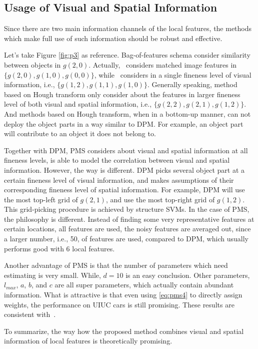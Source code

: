 \subsection{Usage of Visual and Spatial Information}
Since there are two main information channels of the local features, the methods which make full use of such information should be robust and effective.

Let's take Figure \ref{fig:p3} as reference. Bag-of-features schema consider similarity between objects in $g(2,0)$. Actually,~\citep{pmk} considers matched image features in $\{g(2,0),g(1,0),g(0,0)\}$, while~\citep{spmk} considers in a single fineness level of visual information, i.e., $\{g(1,2),g(1,1),g(1,0)\}$. Generally speaking, method based on Hough transform only consider about the features in larger fineness level of both visual and spatial information, i.e., $\{g(2,2),g(2,1),g(1,2)\}$. And methods based on Hough transform, when in a bottom-up manner, can not deploy the object parts in a way similar to DPM. For example, an object part will contribute to an object it does not belong to.

Together with DPM, PMS considers about visual and spatial information at all fineness levels, is able to model the correlation between visual and spatial information. However, the way is different. DPM picks several object part at a certain fineness level of visual information, and makes assumptions of their corresponding fineness level of spatial information. For example, DPM will use the most top-left grid of $g(2,1)$, and use the most top-right grid of $g(1,2)$. This grid-picking procedure is achieved by structure SVMs. In the case of PMS, the philosophy is different. Instead of finding some very representative features at certain locations, all features are used, the noisy features are averaged out, since a larger number, i.e., 50, of features are used, compared to DPM, which usually performs good with 6 local features.

Another advantage of PMS is that the number of parameters which need estimating is very small. While, $d=10$ is an easy conclusion. Other parameters, $l_{max}$, $a$, $b$, and $c$ are all super parameters, which actually contain abundant information. What is attractive is that even using \ref{eq:pms4} to directly assign weights, the performance on UIUC cars is still promising. These results are consistent with~\citep{pmk}.

To summarize, the way how the proposed method combines visual and spatial information of local features is theoretically promising.

